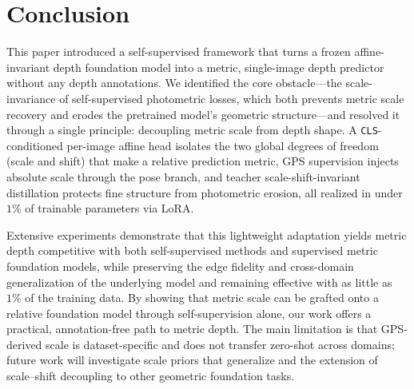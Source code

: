 \documentclass[journal]{IEEEtran}
\begin{document}
\section{Conclusion}\label{sec6}
This paper introduced a self-supervised framework that turns a frozen affine-invariant depth foundation model into a metric, single-image depth predictor without any depth annotations. We identified the core obstacle---the scale-invariance of self-supervised photometric losses, which both prevents metric scale recovery and erodes the pretrained model's geometric structure---and resolved it through a single principle: decoupling metric scale from depth shape. A \texttt{CLS}-conditioned per-image affine head isolates the two global degrees of freedom (scale and shift) that make a relative prediction metric, GPS supervision injects absolute scale through the pose branch, and teacher scale-shift-invariant distillation protects fine structure from photometric erosion, all realized in under $1\%$ of trainable parameters via LoRA.

Extensive experiments demonstrate that this lightweight adaptation yields metric depth competitive with both self-supervised methods and supervised metric foundation models, while preserving the edge fidelity and cross-domain generalization of the underlying model and remaining effective with as little as $1\%$ of the training data. By showing that metric scale can be grafted onto a relative foundation model through self-supervision alone, our work offers a practical, annotation-free path to metric depth. The main limitation is that GPS-derived scale is dataset-specific and does not transfer zero-shot across domains; future work will investigate scale priors that generalize and the extension of scale--shift decoupling to other geometric foundation tasks.

%





\end{document}
